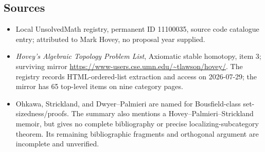 \documentclass[11pt]{article}
\begin{document}
\subsection{Sources}
\begin{itemize}
\item Local UnsolvedMath registry, permanent ID 11100035, source code catalogue entry; attributed to Mark Hovey, no proposal year supplied.
\item \emph{Hovey's Algebraic Topology Problem List}, Axiomatic stable homotopy, item 3; surviving mirror \url{https://www-users.cse.umn.edu/~tlawson/hovey/}. The registry records HTML-ordered-list extraction and access on 2026-07-29; the mirror has 65 top-level items on nine category pages.
\item Ohkawa, Strickland, and Dwyer--Palmieri are named for Bousfield-class set-sizedness/proofs. The summary also mentions a Hovey--Palmieri--Strickland memoir, but gives no complete bibliography or precise localizing-subcategory theorem. Its remaining bibliographic fragments and orthogonal argument are incomplete and unverified.
\end{itemize}
\end{document}
